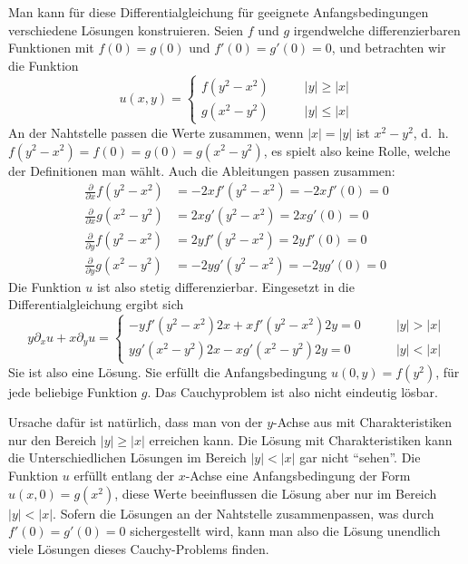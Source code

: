 \begin{loesung}
Man kann für diese Differentialgleichung für geeignete Anfangsbedingungen
verschiedene Lösungen konstruieren. Seien $f$ und $g$ irgendwelche
differenzierbaren Funktionen mit $f(0)=g(0)$ und $f'(0)=g'(0)=0$,
und betrachten wir die Funktion
\[
u(x,y)=\begin{cases}
f(y^2-x^2)&\qquad |y|\ge|x|\\
g(x^2-y^2)&\qquad |y|\le|x|
\end{cases}
\]
An der Nahtstelle passen die Werte zusammen, wenn $|x|=|y|$ ist $x^2-y^2$,
d.~h.~$f(y^2-x^2)=f(0)=g(0)=g(x^2-y^2)$, es spielt also keine Rolle, welche
der Definitionen man wählt.
Auch die Ableitungen passen zusammen:
\begin{align*}
\frac{\partial}{\partial x}f(y^2-x^2)&=-2xf'(y^2-x^2)=-2xf'(0)=0
\\
\frac{\partial}{\partial x}g(x^2-y^2)&=2xg'(y^2-x^2)=2xg'(0)=0
\\
\frac{\partial}{\partial y}f(y^2-x^2)&=2yf'(y^2-x^2)=2yf'(0)=0
\\
\frac{\partial}{\partial y}g(x^2-y^2)&=-2yg'(y^2-x^2)=-2yg'(0)=0
\end{align*}
Die Funktion $u$ ist also stetig differenzierbar.
Eingesetzt in die Differentialgleichung ergibt sich
\[
y\partial_xu+x\partial_yu
=
\begin{cases}
-yf'(y^2-x^2)2x+xf'(y^2-x^2)2y=0&\qquad |y|>|x|\\
yg'(x^2-y^2)2x-xg'(x^2-y^2)2y=0&\qquad |y|<|x|
\end{cases}
\]
Sie ist also eine Lösung. Sie erfüllt die Anfangsbedingung
$u(0,y)=f(y^2)$, für jede beliebige Funktion $g$. Das Cauchyproblem
ist also nicht eindeutig lösbar.

Ursache dafür ist natürlich, dass man von der $y$-Achse aus mit
Charakteristiken nur den Bereich $|y|\ge |x|$ erreichen kann.
Die Lösung mit Charakteristiken kann die Unterschiedlichen Lösungen
im Bereich $|y|<|x|$ gar nicht ``sehen''.
Die Funktion $u$ erfüllt entlang der $x$-Achse eine Anfangsbedingung
der Form $u(x,0)=g(x^2)$, diese Werte beeinflussen die Lösung aber
nur im Bereich $|y|<|x|$. Sofern die Lösungen an der Nahtstelle
zusammenpassen, was durch $f'(0)=g'(0)=0$ sichergestellt wird,
kann man also die Lösung unendlich viele Lösungen dieses Cauchy-Problems
finden.
\end{loesung}

